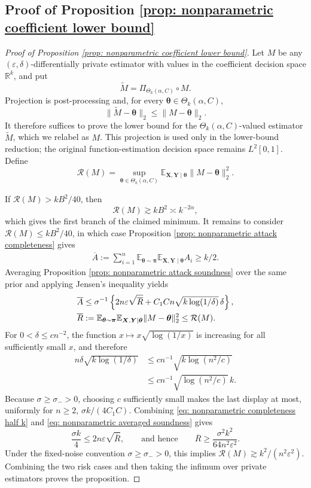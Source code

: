 \documentclass[letterpaper,12pt]{article}
\numberwithin{equation}{section}
\theoremstyle{plain}
\numberwithin{Theorem}{section}
\numberwithin{proposition}{section}
\numberwithin{Lemma}{section}
{
	\theoremstyle{definition}
	\newtheorem{Definition}{Definition}
	\newtheorem{example}{Example}
	\numberwithin{example}{section}
	\newtheorem{fact}{Fact}
	\numberwithin{fact}{section}
	\newtheorem{remark}{Remark}
}
\newcommand{\furtherrev}[1]{#1}
\newcommand{\1}{\mathbbm{1}}
\def\bth{{\boldsymbol{\theta}}}
\def\E{\mathbb{E}}
\begin{document}
\subsection{Proof of Proposition \ref{prop: nonparametric coefficient lower bound}}\label{sec: proof of prop: nonparametric coefficient lower bound}
\begin{proof}[Proof of Proposition \ref{prop: nonparametric coefficient lower bound}]
		Let $M$ be any $(\varepsilon,\delta)$-differentially private estimator \furtherrev{with values in the coefficient decision space $\mathbb R^k$}, and put
		\[
		\widetilde M=\Pi_{\Theta_k(\alpha,C)}\circ M.
		\]
		Projection is post-processing and, for every $\bth\in\Theta_k(\alpha,C)$,
		\[
		\|\widetilde M-\bth\|_2\leq\|M-\bth\|_2.
		\]
		It therefore suffices to prove the lower bound for the $\Theta_k(\alpha,C)$-valued estimator $\widetilde M$, which we relabel as $M$. \furtherrev{This projection is used only in the lower-bound reduction; the original function-estimation decision space remains $L^2[0,1]$.} Define
		\[
		\mathcal R(M)=\sup_{\bth\in\Theta_k(\alpha,C)}
		\E_{\bm X,\bm Y\mid\bth}\|M-\bth\|_2^2.
		\]

		If $\mathcal R(M)>kB^2/40$, then
		\[
		\mathcal R(M)\gtrsim kB^2\asymp k^{-2\alpha},
		\]
		which gives the first branch of the claimed minimum. It remains to consider
		$\mathcal R(M)\leq kB^2/40$, in which case Proposition
		\ref{prop: nonparametric attack completeness} gives
		\begin{align}\label{eq: nonparametric completeness half k}
		\overline A:=\sum_{i=1}^n\E_{\bth\sim\bm\pi}
		\E_{\bm X,\bm Y\mid\bth}A_i\geq k/2.
		\end{align}
		Averaging Proposition \ref{prop: nonparametric attack soundness} over the same prior and applying Jensen's inequality yields
		\begin{align}\label{eq: nonparametric averaged soundness}
		\overline A
		&\leq \sigma^{-1}\left\{2n\varepsilon\sqrt{\overline R}
		+C_1Cn\sqrt{k\log(1/\delta)}\,\delta\right\},\\
		\overline R
		&:=\E_{\bth\sim\bm\pi}\E_{\bm X,\bm Y\mid\bth}
		\|M-\bth\|_2^2\leq\mathcal R(M).\notag
		\end{align}
		For $0<\delta\leq cn^{-2}$, the function
		$x\mapsto x\sqrt{\log(1/x)}$ is increasing for all sufficiently small $x$, and therefore
		\begin{align*}
		n\delta\sqrt{k\log(1/\delta)}
		&\leq cn^{-1}\sqrt{k\log(n^2/c)}\\
		&\leq cn^{-1}\sqrt{\log(n^2/c)}\,k.
		\end{align*}
			Because $\sigma\geq\sigma_->0$, choosing $c$ sufficiently small makes the last display at most, uniformly for $n\geq2$,
		$\sigma k/(4C_1C)$. Combining \eqref{eq: nonparametric completeness half k} and \eqref{eq: nonparametric averaged soundness} gives
		\[
		\frac{\sigma k}{4}\leq2n\varepsilon\sqrt{\overline R},
		\qquad\text{and hence}\qquad
		\overline R\geq\frac{\sigma^2k^2}{64n^2\varepsilon^2}.
		\]
		Under the fixed-noise convention $\sigma\geq\sigma_->0$, this implies
		$\mathcal R(M)\gtrsim k^2/(n^2\varepsilon^2)$. Combining the two risk cases and then taking the infimum over private estimators proves the proposition.
\end{proof}
\end{document}
